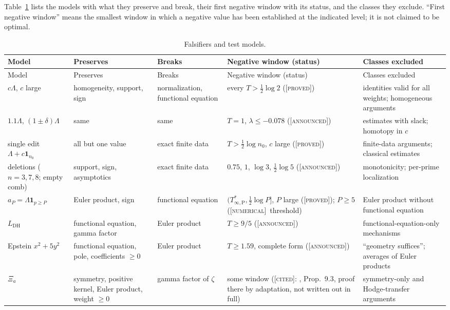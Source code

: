 \documentclass[11pt]{amsart}
\theoremstyle{definition}
\theoremstyle{remark}
\numberwithin{equation}{section}
\newcommand{\Tarch}{T^{*}_{\infty,\mathrm P}}          %
\newcommand{\stag}[1]{\textsc{[#1]}}
\newcommand{\PROVED}{\stag{proved}}
\newcommand{\CITED}{\stag{cited}}
\newcommand{\NUM}{\stag{numerical}}
\newcommand{\ANNOUNCED}{\stag{announced}}
\begin{document}
Table~\ref{w3:tab:falsifiers} lists the models with what they preserve and break, their first negative window
with its status, and the classes they exclude. ``First negative window'' means the smallest window in which a
negative value has been established at the indicated level; it is not claimed to be optimal.

{\small
\begin{longtable}{>{\raggedright}p{2.6cm}>{\raggedright}p{2.9cm}>{\raggedright}p{2.3cm}>{\raggedright}p{2.4cm}>{\raggedright\arraybackslash}p{3.4cm}}
\caption{Falsifiers and test models.}\label{w3:tab:falsifiers}\\
\toprule
Model & Preserves & Breaks & Negative window (status) & Classes excluded\\
\midrule\endfirsthead
\toprule
Model & Preserves & Breaks & Negative window (status) & Classes excluded\\
\midrule\endhead
\bottomrule\endfoot
$c\Lambda$, $c$ large & homogeneity, support, sign & normalization, functional equation & every $T>\frac12\log2$ (\PROVED) & identities valid for all weights; homogeneous arguments\\
$1.1\Lambda$, $(1\pm\delta)\Lambda$ & same & same & $T=1$, $\lambda\le-0.078$ (\ANNOUNCED) & estimates with slack; homotopy in $c$\\
single edit $\Lambda+c\mathbf 1_{n_0}$ & all but one value & exact finite data & $T>\frac12\log n_0$, $c$ large (\PROVED) & finite-data arguments; classical estimates\\
deletions ($n=3,7,8$; empty comb) & support, sign, asymptotics & exact finite data & $0.75$, $1$, $\log3$, $\frac12\log5$ (\ANNOUNCED) & monotonicity; per-prime localization\\
$a_P=\Lambda\mathbf 1_{p\ge P}$ & Euler product, sign & functional equation & $(\Tarch,\frac12\log P]$, $P$ large (\PROVED); $P\ge5$ (\NUM\ threshold) & Euler product without functional equation\\
$L_{\mathrm{DH}}$ & functional equation, gamma factor & Euler product & $T\ge9/5$ (\ANNOUNCED) & functional-equation-only mechanisms\\
Epstein $x^2+5y^2$ & functional equation, pole, coefficients $\ge0$ & Euler product & $T\ge1.59$, complete form (\ANNOUNCED) & ``geometry suffices''; averages of Euler products\\
$\Xi_a$ & symmetry, positive kernel, Euler product, weight $\ge0$ & gamma factor of $\zeta$ & some window (\CITED: \cite{P47}, Prop.~9.3, proof there by adaptation, not written out in full) & symmetry-only and Hodge-transfer arguments\\

\end{longtable}}
\end{document}
